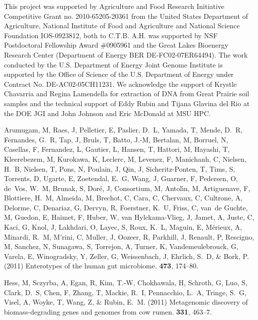 \documentclass{pnastwo}
\begin{document}
\begin{article}
\begin{acknowledgments} This project was supported by Agriculture and Food
Research Initiative Competitive Grant no. 2010-65205-20361 from the United
States Department of Agriculture, National Institute of Food and Agriculture and
National Science Foundation IOS-0923812, both to C.T.B. A.H. was supported by
NSF Postdoctoral Fellowship Award \#0905961 and the Great Lakes Bioenergy
Research Center (Department of Energy BER DE-FC02-07ER64494). The work conducted
by the U.S. Department of Energy Joint Genome Institute is supported by the
Office of Science of the U.S. Department of Energy under Contract No.
DE-AC02-05CH11231. We acknowledge the support of Krystle Chavarria and Regina
Lamendella for extraction of DNA from Great Prairie soil samples and the
technical support of Eddy Rubin and Tijana Glavina del Rio at the DOE JGI and
John Johnson and Eric McDonald at MSU HPC. \end{acknowledgments}


\begin{thebibliography}{10}

 Arumugam, M, Raes, J, Pelletier, E, Paslier, D.~L,
Yamada, T, Mende, D.~R, Fernandes, G.~R, Tap, J, Bruls, T, Batto, J.-M,
Bertalan, M, Borruel, N, Casellas, F, Fernandez, L, Gautier, L, Hansen, T,
Hattori, M, Hayashi, T, Kleerebezem, M, Kurokawa, K, Leclerc, M, Levenez, F,
Manichanh, C, Nielsen, H.~B, Nielsen, T, Pons, N, Poulain, J, Qin, J,
Sicheritz-Ponten, T, Tims, S, Torrents, D, Ugarte, E, Zoetendal, E.~G, Wang, J,
Guarner, F, Pedersen, O, de~Vos, W.~M, Brunak, S, Dor{\'e}, J, Consortium, M,
Antol{\'\i}n, M, Artiguenave, F, Blottiere, H.~M, Almeida, M, Brechot, C, Cara,
C, Chervaux, C, Cultrone, A, Delorme, C, Denariaz, G, Dervyn, R, Foerstner,
K.~U, Friss, C, van~de Guchte, M, Guedon, E, Haimet, F, Huber, W, van
Hylckama-Vlieg, J, Jamet, A, Juste, C, Kaci, G, Knol, J, Lakhdari, O, Layec, S,
Roux, K.~L, Maguin, E, M{\'e}rieux, A, Minardi, R.~M, M'rini, C, Muller, J,
Oozeer, R, Parkhill, J, Renault, P, Rescigno, M, Sanchez, N, Sunagawa, S,
Torrejon, A, Turner, K, Vandemeulebrouck, G, Varela, E, Winogradsky, Y, Zeller,
G, Weissenbach, J, Ehrlich, S.~D, \& Bork, P. \newblock (2011) Enterotypes of
the human gut microbiome.  {\bf 473}, 174--80.

 Hess, M, Sczyrba, A, Egan, R, Kim, T.-W, Chokhawala, H,
Schroth, G, Luo, S, Clark, D.~S, Chen, F, Zhang, T, Mackie, R.~I, Pennacchio,
L.~A, Tringe, S.~G, Visel, A, Woyke, T, Wang, Z, \& Rubin, E.~M. \newblock
(2011) Metagenomic discovery of biomass-degrading genes and genomes from cow
rumen.  {\bf 331}, 463--7.


\end{thebibliography}
\end{article}
\end{document}
